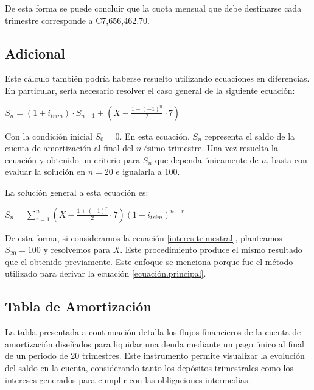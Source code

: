\documentclass[paper=a4, fontsize=11pt,twoside]{article} %
\begin{document}
    De esta forma se puede concluir que la cuota mensual que debe destinarse cada trimestre corresponde a ₡{7,656,462.70}.%

    \subsection*{Adicional}

    \begin{multicols}{2}
        Este cálculo también podría haberse resuelto utilizando ecuaciones en diferencias. En particular, sería necesario resolver el caso general de la siguiente ecuación:

        \begin{center}
            $S_n = (1+i_{trim})\cdot S_{n-1} + \left(X - \frac{1+(-1)^n}{2} \cdot 7 \right)$
        \end{center}
        
        Con la condición inicial \( S_0 = 0 \). En esta ecuación, \( S_n \) representa el saldo de la cuenta de amortización al final del \( n \)-ésimo trimestre. Una vez resuelta la ecuación y obtenido un criterio para \( S_n \) que dependa únicamente de \( n \), basta con evaluar la solución en \( n=20 \) e igualarla a 100.

        \columnbreak
        La solución general a esta ecuación es:
        
        \begin{center}
            $S_n = \displaystyle\sum_{r=1}^n \left(X - \frac{1+(-1)^r}{2} \cdot 7 \right)(1+i_{trim})^{n-r}$
        \end{center}
        
        De esta forma, si consideramos la ecuación \eqref{interes.trimestral}, planteamos \( S_{20} = 100 \) y resolvemos para \( X \). Este procedimiento produce el mismo resultado que el obtenido previamente. Este enfoque se menciona porque fue el método utilizado para derivar la ecuación \eqref{ecuación.principal}.
        
    \end{multicols}

    \subsection*{Tabla de Amortización}

    La tabla presentada a continuación detalla los flujos financieros de la cuenta de amortización diseñados para liquidar una deuda mediante un pago único al final de un periodo de 20 trimestres. Este instrumento permite visualizar la evolución del saldo en la cuenta, considerando tanto los depósitos trimestrales como los intereses generados para cumplir con las obligaciones intermedias.
    
\end{document}
